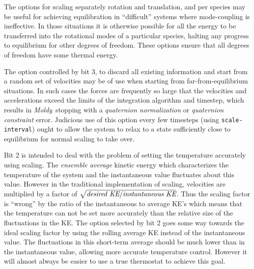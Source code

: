 \documentclass[twoside]{report}
\newcommand{\moldy}{{\em Moldy}}
\begin{document}
The options for scaling separately rotation and translation, and per
species may be useful for achieving equilibration in ``difficult''
systems where mode-coupling is ineffective.  In those situations it is
otherwise possible for all the energy to be transferred into the
rotational modes of a particular species, halting any progress to
equilibrium for other degrees of freedom.   These options ensure that
all degrees of freedom have some thermal energy.

The option controlled by bit 3, to discard all existing information
and start from a random set of velocities may be of use when starting
from far-from-equilibrium situations.  In such cases the forces
are frequently so large that the velocities and accelerations exceed
the limits of the integration algorithm and timestep, which results in
\moldy\ stopping with a {\em quaternion normalization\/} or {\em
quaternion constraint\/} error.  Judicious use of this option every few
timesteps (using \texttt{scale-interval}) ought to allow the system to
relax to a state sufficiently close to equilibrium for normal scaling
to take over.

Bit 2 is intended to deal with the problem of setting the temperature
accurately using scaling.  The {\em ensemble average\/} kinetic energy
which characterizes the temperature of the system and the
instantaneous value fluctuates about this value.  However in the
traditional implementation of scaling, velocities are multiplied by a
factor of $\sqrt{\mbox{\it desired KE} / \mbox{\it instantaneous
    KE}}$.  Thus the scaling factor is ``wrong'' by the ratio of the
instantaneous to average KE's which means that the temperature can not
be set more accurately than the relative size of the fluctuations in
the KE\@.  The option selected by bit 2 goes some way towards the
ideal scaling factor by using the rolling average KE instead of the
instantaneous value.  The fluctuations in this short-term average
should be much lower than in the instantaneous value, allowing more
accurate temperature control.  However it will almost always be easier
to use a true thermostat to achieve this goal.


\end{document}
